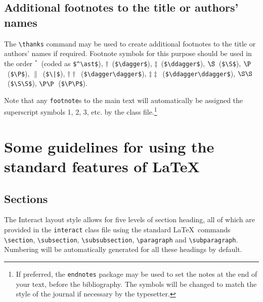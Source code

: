 \documentclass[]{interact}
\theoremstyle{plain}%
\theoremstyle{definition}
\theoremstyle{remark}
\begin{document}
\subsection{Additional footnotes to the title or authors' names}

The \verb"\thanks" command may be used to create additional footnotes to the title or authors' names if required. Footnote symbols for this purpose should be used in the order
$^\ast$~(coded as \verb"$^\ast$"), $\dagger$~(\verb"$\dagger$"), $\ddagger$~(\verb"$\ddagger$"), $\S$~(\verb"$\S$"), $\P$~(\verb"$\P$"), $\|$~(\verb"$\|$"),
$\dagger\dagger$~(\verb"$\dagger\dagger$"), $\ddagger\ddagger$~(\verb"$\ddagger\ddagger$"), $\S\S$~(\verb"$\S\S$"), $\P\P$~(\verb"$\P\P$").

Note that any \verb"footnote"s to the main text will automatically be assigned the superscript symbols 1, 2, 3, etc. by the class file.\footnote{If preferred, the \texttt{endnotes} package
may be used to set the notes at the end of your text, before the bibliography. The symbols will be changed to match the style of the journal if necessary by the typesetter.}


\section{Some guidelines for using the standard features of \LaTeX}

\subsection{Sections}

The \textsf{Interact} layout style allows for five levels of section heading, all of which are provided in the \texttt{interact} class file using the standard \LaTeX\ commands \verb"\section", \verb"\subsection", \verb"\subsubsection", \verb"\paragraph" and \verb"\subparagraph". Numbering will be automatically generated for all these headings by default.
\end{document}
